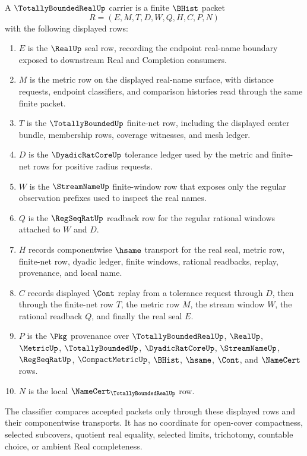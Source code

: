 \begin{definition}
\label{def:totally-bounded-real-carrier}
A $\TotallyBoundedRealUp$ carrier is a finite $\BHist$ packet
$$
R=(E,M,T,D,W,Q,H,C,P,N)
$$
with the following displayed rows:
\begin{enumerate}
\item $E$ is the $\RealUp$ seal row, recording the endpoint real-name boundary exposed to downstream Real and Completion consumers.
\item $M$ is the metric row on the displayed real-name surface, with distance requests, endpoint classifiers, and comparison histories read through the same finite packet.
\item $T$ is the $\TotallyBoundedUp$ finite-net row, including the displayed center bundle, membership rows, coverage witnesses, and mesh ledger.
\item $D$ is the $\DyadicRatCoreUp$ tolerance ledger used by the metric and finite-net rows for positive radius requests.
\item $W$ is the $\StreamNameUp$ finite-window row that exposes only the regular observation prefixes used to inspect the real names.
\item $Q$ is the $\RegSeqRatUp$ readback row for the regular rational windows attached to $W$ and $D$.
\item $H$ records componentwise $\hsame$ transport for the real seal, metric row, finite-net row, dyadic ledger, finite windows, rational readbacks, replay, provenance, and local name.
\item $C$ records displayed $\Cont$ replay from a tolerance request through $D$, then through the finite-net row $T$, the metric row $M$, the stream window $W$, the rational readback $Q$, and finally the real seal $E$.
\item $P$ is the $\Pkg$ provenance over $\TotallyBoundedRealUp$, $\RealUp$, $\MetricUp$, $\TotallyBoundedUp$, $\DyadicRatCoreUp$, $\StreamNameUp$, $\RegSeqRatUp$, $\CompactMetricUp$, $\BHist$, $\hsame$, $\Cont$, and $\NameCert$ rows.
\item $N$ is the local $\NameCert_{\TotallyBoundedRealUp}$ row.
\end{enumerate}
The classifier compares accepted packets only through these displayed rows and their componentwise transports. It has no coordinate for open-cover compactness, selected subcovers, quotient real equality, selected limits, trichotomy, countable choice, or ambient Real completeness.
\end{definition}

